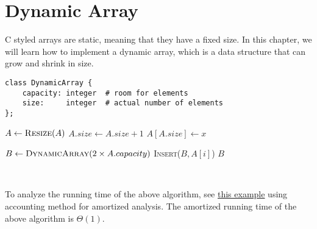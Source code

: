 \chapter{Dynamic Array}

C styled arrays are static, meaning that they have a fixed size. In this chapter, we will learn how to implement a dynamic array, which is a data structure that can grow and shrink in size.

\begin{verbatim}
class DynamicArray {
    capacity: integer  # room for elements
    size:     integer  # actual number of elements
};
\end{verbatim}

\begin{minipage}[t]{0.4\linewidth} \begin{algorithm}[H] \begin{algorithmic}[1]
    \label{algo:da_insert}
            \State $A \gets \textsc{Resize}(A)$
        \EndIf
        \State $A.size \gets A.size + 1$
        \State $A[A.size] \gets x$
    \EndProcedure
\end{algorithmic} \end{algorithm} \end{minipage}
\hfill
\begin{minipage}[t]{0.5\linewidth} \begin{algorithm}[H] \begin{algorithmic}[1]
        \State $B \gets \textsc{DynamicArray}(2 \times A.capacity)$
            \State \textsc{Insert}($B, A[i]$)
        \EndFor
        \State \Return $B$
    \EndProcedure
\end{algorithmic} \end{algorithm} \end{minipage}

{~~~}

To analyze the running time of the above algorithm, see \hyperref[exam:amortized_accounting]{this example} using accounting method for amortized analysis. The amortized running time of the above algorithm is $\Theta(1)$.